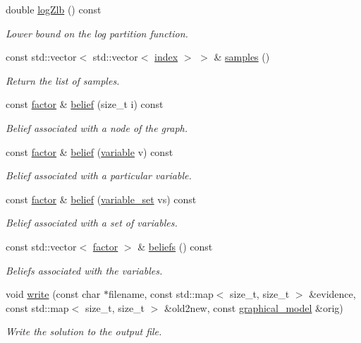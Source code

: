 \begin{DoxyCompactItemize}
double \hyperlink{classmerlin_1_1gibbs_ab4ee1ac60166f1e30b14e07a534aa4b8}{log\+Zlb} () const 
\begin{DoxyCompactList}\small\item\em Lower bound on the log partition function. \end{DoxyCompactList}\item 
\hypertarget{classmerlin_1_1gibbs_a2b8c1231e5f9c770ab94d8bac275014a}{}const std\+::vector$<$ std\+::vector$<$ \hyperlink{classmerlin_1_1graph_a5cade38832f47248573e921276f122d6}{index} $>$ $>$ \& \hyperlink{classmerlin_1_1gibbs_a2b8c1231e5f9c770ab94d8bac275014a}{samples} ()\label{classmerlin_1_1gibbs_a2b8c1231e5f9c770ab94d8bac275014a}

\begin{DoxyCompactList}\small\item\em Return the list of samples. \end{DoxyCompactList}\item 
const \hyperlink{classmerlin_1_1factor}{factor} \& \hyperlink{classmerlin_1_1gibbs_a578f69706383e3a29fabc65e8001b433}{belief} (size\+\_\+t i) const 
\begin{DoxyCompactList}\small\item\em Belief associated with a node of the graph. \end{DoxyCompactList}\item 
const \hyperlink{classmerlin_1_1factor}{factor} \& \hyperlink{classmerlin_1_1gibbs_aea5e692a62aee1fff134398565e85c6e}{belief} (\hyperlink{classmerlin_1_1variable}{variable} v) const 
\begin{DoxyCompactList}\small\item\em Belief associated with a particular variable. \end{DoxyCompactList}\item 
const \hyperlink{classmerlin_1_1factor}{factor} \& \hyperlink{classmerlin_1_1gibbs_af8b834f1ca8b2775a2a896b32442e303}{belief} (\hyperlink{classmerlin_1_1variable__set}{variable\+\_\+set} vs) const 
\begin{DoxyCompactList}\small\item\em Belief associated with a set of variables. \end{DoxyCompactList}\item 
const std\+::vector$<$ \hyperlink{classmerlin_1_1factor}{factor} $>$ \& \hyperlink{classmerlin_1_1gibbs_aae4b98aa02e5483d04fed2d9046c0900}{beliefs} () const 
\begin{DoxyCompactList}\small\item\em Beliefs associated with the variables. \end{DoxyCompactList}\item 
void \hyperlink{classmerlin_1_1gibbs_abc72faf8af4e1fb813df7bc9b6522950}{write} (const char $\ast$filename, const std\+::map$<$ size\+\_\+t, size\+\_\+t $>$ \&evidence, const std\+::map$<$ size\+\_\+t, size\+\_\+t $>$ \&old2new, const \hyperlink{classmerlin_1_1graphical__model}{graphical\+\_\+model} \&orig)
\begin{DoxyCompactList}\small\item\em Write the solution to the output file. \end{DoxyCompactList}\end{DoxyCompactItemize}
